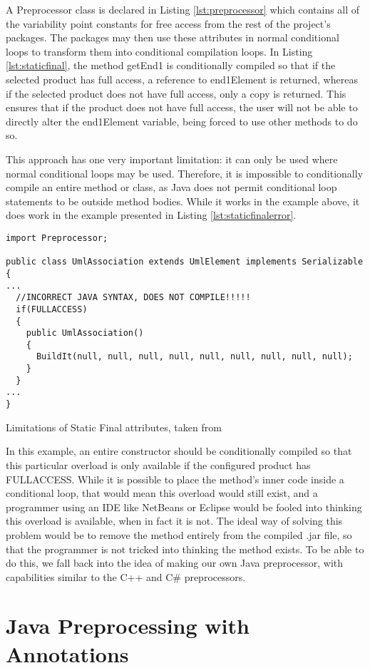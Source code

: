 A Preprocessor class is declared in Listing \ref{lst:preprocessor} which contains all of the variability point constants for free access from the rest of the project's packages. The packages may then use these attributes in normal conditional loops to transform them into conditional compilation loops. In Listing \ref{lst:staticfinal}, the method getEnd1 is conditionally compiled so that if the selected product has full access, a reference to end1Element is returned, whereas if the selected product does not have full access, only a copy is returned. This ensures that if the product does not have full access, the user will not be able to directly alter the end1Element variable, being forced to use other methods to do so.

This approach has one very important limitation: it can only be used where normal conditional loops may be used. Therefore, it is impossible to conditionally compile an entire method or class, as Java does not permit conditional loop statements to be outside method bodies. While it works in the example above, it does work in the example presented in Listing \ref{lst:staticfinalerror}.

\begin{listing}
\begin{verbatim}
import Preprocessor;

public class UmlAssociation extends UmlElement implements Serializable
{
...
  //INCORRECT JAVA SYNTAX, DOES NOT COMPILE!!!!!
  if(FULLACCESS)
  {
    public UmlAssociation()
    {
      BuildIt(null, null, null, null, null, null, null, null, null);
    }
  }
...
}
\end{verbatim}
\caption{Limitations of Static Final attributes, taken from \cite{AUTOREST}} \label{lst:staticfinalerror}
\end{listing}

In this example, an entire constructor should be conditionally compiled so that this particular overload is only available if the configured product has FULLACCESS. While it is possible to place the method's inner code inside a conditional loop, that would mean this overload would still exist, and a programmer using an IDE like NetBeans or Eclipse would be fooled into thinking this overload is available, when in fact it is not. The ideal way of solving this problem would be to remove the method entirely from the compiled .jar file, so that the programmer is not tricked into thinking the method exists. To be able to do this, we fall back into the idea of making our own Java preprocessor, with capabilities similar to the C++ and C\# preprocessors.


\section{Java Preprocessing with Annotations}
